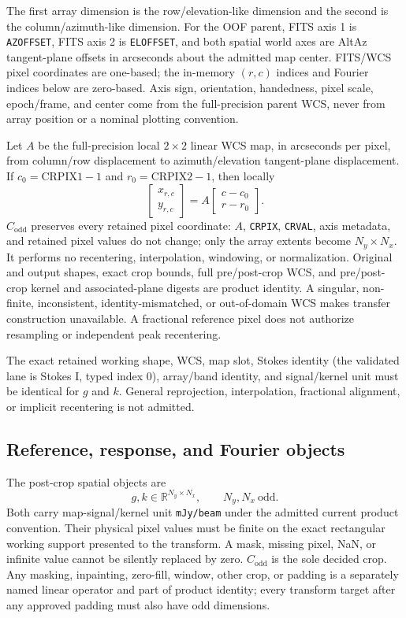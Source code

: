 \documentclass[11pt]{article}
\newcommand{\R}{\mathbb{R}}
\begin{document}
The first array dimension is the row/elevation-like dimension and the second
is the column/azimuth-like dimension.  For the OOF parent, FITS axis 1 is
\texttt{AZOFFSET}, FITS axis 2 is \texttt{ELOFFSET}, and both spatial world
axes are AltAz tangent-plane offsets in arcseconds about the admitted map
center.  FITS/WCS pixel coordinates are one-based; the in-memory $(r,c)$
indices and Fourier indices below are zero-based.  Axis sign, orientation,
handedness, pixel scale, epoch/frame, and center come from the full-precision
parent WCS, never from array position or a nominal plotting convention.

Let $A$ be the full-precision local $2\times2$ linear WCS map, in
arcseconds per pixel, from column/row displacement to
azimuth/elevation tangent-plane displacement.  If
$c_0=\mathrm{CRPIX1}-1$ and $r_0=\mathrm{CRPIX2}-1$, then locally
\[
 \begin{bmatrix}x_{r,c}\\y_{r,c}\end{bmatrix}
 = A\begin{bmatrix}c-c_0\\r-r_0\end{bmatrix}.
\]
$C_{\mathrm{odd}}$ preserves every retained pixel coordinate: $A$,
\texttt{CRPIX}, \texttt{CRVAL}, axis metadata, and retained pixel values do not
change; only the array extents become $N_y\times N_x$.  It performs no
recentering, interpolation, windowing, or normalization.  Original and output
shapes, exact crop bounds, full pre/post-crop WCS, and pre/post-crop kernel and
associated-plane digests are product identity.  A singular, non-finite,
inconsistent, identity-mismatched, or out-of-domain WCS makes transfer
construction unavailable.  A fractional
reference pixel does not authorize resampling or independent peak recentering.

The exact retained working shape, WCS, map slot, Stokes identity (the validated
lane is Stokes I, typed index 0), array/band identity, and signal/kernel unit
must be identical for $g$ and $k$.  General reprojection, interpolation,
fractional alignment, or implicit recentering is not admitted.

\subsection{Reference, response, and Fourier objects}

The post-crop spatial objects are
\[
 g,k\in\R^{N_y\times N_x},\qquad N_y,N_x\ \text{odd}.
\]
Both carry map-signal/kernel unit \texttt{mJy/beam} under the admitted current
product convention.  Their physical pixel values must be finite on the exact
rectangular working support presented to the transform.  A mask, missing
pixel, NaN, or infinite value cannot be silently replaced by zero.
$C_{\mathrm{odd}}$ is the sole decided crop.  Any masking, inpainting,
zero-fill, window, other crop, or padding is a separately named linear operator
and part of product identity; every transform target after any approved
padding must also have odd dimensions.
\end{document}
